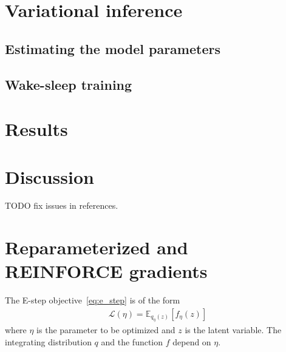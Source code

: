 \documentclass[12pt]{article}
\newcommand{\Expect}{\mathbb{E}}
\begin{document}
\section{Variational inference}
\label{sec:var_inference}


\subsection{Estimating the model parameters}
\label{sec:model_params}


\subsection{Wake-sleep training}
\label{sec:wake_sleep}


% 

\section{Results}
\label{sec:results}




\section{Discussion}
\label{sec:discussion}


TODO fix issues in references. 



\appendix
\section{Reparameterized and REINFORCE gradients}

The E-step objective~\eqref{eq:e_step} is of the form 
\begin{align}
    \mathcal{L}(\eta) = \Expect_{q_\eta(z)}[f_\eta(z)]
\end{align}
where $\eta$ is the parameter to be optimized and $z$ is the latent variable. The integrating distribution $q$ and the function $f$ depend on $\eta$. 
\end{document}
